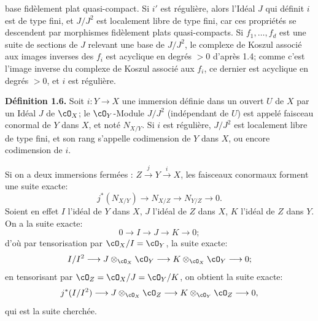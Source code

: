base fidèlement plat quasi-compact. Si $i'$ est régulière, alors l'Idéal $J$ qui définit $i$ est de type fini, et $J/J^2$ est localement libre de type fini, car ces propriétés se descendent par morphismes fidèlement plats quasi-compacts. Si $f_1,\ldots,f_d$ est une suite de sections de $J$ relevant une base de $J/J^2$, le complexe de Koszul associé aux images inverses des $f_i$ est acyclique en degrés $>0$ d'après 1.4; comme c'est l'image inverse du complexe de Koszul associé aux $f_i$, ce dernier est acyclique en degrés $>0$, et $i$ est régulière.

\textbf{Définition 1.6.} Soit $i:Y\longrightarrow X$ une immersion définie dans un ouvert $U$ de $X$ par un Idéal $J$ de $\cO_X$; le $\cO_Y$-Module $J/J^2$ (indépendant de $U$) est appelé faisceau conormal de $Y$ dans $X$, et noté $N_{X/Y}$. Si $i$ est régulière, $J/J^2$ est localement libre de type fini, et son rang s'appelle codimension de $Y$ dans $X$, ou encore codimension de $i$.

Si on a deux immersions fermées : $Z\xrightarrow{j}Y\xrightarrow{i}X$, les faisceaux conormaux forment une suite exacte:
\begin{equation}\tag{1.6.1}
 j^*(N_{X/Y})\longrightarrow N_{X/Z}\longrightarrow N_{Y/Z}\longrightarrow0.
\end{equation}
Soient en effet $I$ l'idéal de $Y$ dans $X$, $J$ l'idéal de $Z$ dans $X$, $K$ l'idéal de $Z$ dans $Y$. On a la suite exacte:
\[
0\longrightarrow I\longrightarrow J\longrightarrow K\longrightarrow0;
\]
d'où par tensorisation par $\cO_X/I=\cO_Y$, la suite exacte:
\[
 I/I^2\longrightarrow J\otimes_{\cO_X}\cO_Y\longrightarrow K\otimes_{\cO_X}\cO_Y\longrightarrow0;
\]
en tensorisant par $\cO_Z=\cO_X/J=\cO_Y/K$, on obtient la suite exacte:
\[
 j^*(I/I^2)\longrightarrow J\otimes_{\cO_X}\cO_Z\longrightarrow K\otimes_{\cO_Y}\cO_Z\longrightarrow0,
\]
qui est la suite cherchée.

